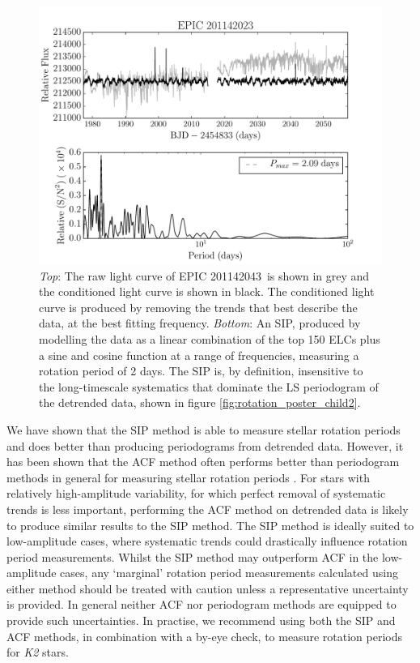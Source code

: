 \documentclass[useAMS, usenatbib, preprint, 12pt]{aastex}
\newcommand{\rpcc}{201142043}
\begin{document}
\begin{figure}
\begin{center}
\includegraphics[width=6in, clip=true]{K2_rotation_201142023.pdf}
\caption{{\it Top}: The raw light curve of EPIC \rpcc\ is shown in grey and
	the conditioned light curve is shown in black. The conditioned light
	curve is produced by removing the trends that best describe the
	data, at the best fitting frequency.
	{\it Bottom}: An SIP, produced by modelling the data as a linear
	combination of the top 150 ELCs plus a sine and cosine function at a
	range of frequencies, measuring a rotation period of 2 days.
	The SIP is, by definition, insensitive to the long-timescale
	systematics that dominate the LS periodogram of the detrended data,
	shown in figure \ref{fig:rotation_poster_child2}.}
\label{fig:K2_rotation_poster_child2}
\end{center}
\end{figure}

We have shown that the SIP method is able to measure stellar rotation periods
and does better than producing periodograms from detrended data.
However, it has been shown that the ACF method often performs better than
periodogram methods in general for measuring stellar rotation periods
\citep[][]{McQuillan2013, McQuillan2013b, Mazeh2015}.
For stars with relatively high-amplitude variability, for which perfect
removal of systematic trends is less important, performing the ACF method
on detrended data is likely to produce similar results to the SIP method.
The SIP method is ideally suited to low-amplitude cases, where systematic
trends could drastically influence rotation period measurements.
Whilst the SIP method may outperform ACF in the low-amplitude cases,
any `marginal' rotation period measurements calculated using either method
should be treated with caution unless a representative uncertainty is provided.
In general neither ACF nor periodogram methods are equipped to provide
such uncertainties.
In practise, we recommend using both the SIP and ACF methods, in combination
with a by-eye check, to measure rotation periods for {\it K2} stars.
\end{document}
